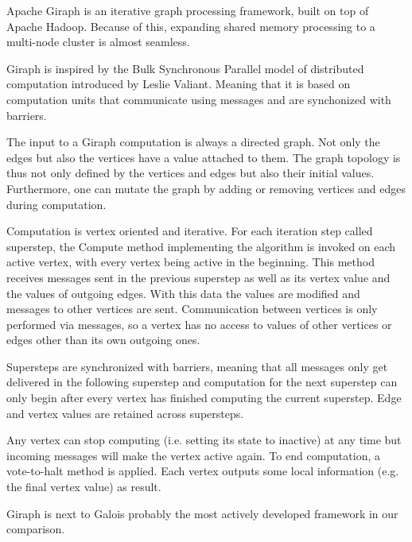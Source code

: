 

Apache Giraph\cite{Giraph} is an iterative graph processing framework, built on top of Apache Hadoop. Because of this, expanding shared memory processing to a multi-node cluster is almost seamless.

Giraph is inspired by the Bulk Synchronous Parallel model of distributed computation introduced by Leslie Valiant\cite{BSPforGiraph}. Meaning that it is based on computation units that communicate using messages and are synchonized with barriers.

The input to a Giraph computation is always a directed graph. Not only the edges but also the vertices have a value attached to them. The graph topology is thus not only defined by the vertices and edges but also their initial values.
Furthermore, one can mutate the graph by adding or removing vertices and edges during computation.

Computation is vertex oriented and iterative.
For each iteration step called superstep, the Compute method implementing the algorithm is invoked on each active vertex, with every vertex being active in the beginning.
This method receives messages sent in the previous superstep as well as its vertex value and the values of outgoing edges.
With this data the values are modified and messages to other vertices are sent.
Communication between vertices is only performed via messages, so a vertex has no access to values of other vertices or edges other than its own outgoing ones.

Supersteps are synchronized with barriers, meaning that all messages only get delivered in the following superstep and computation for the next superstep can only begin after every vertex has finished computing the current superstep.
Edge and vertex values are retained across supersteps.

Any vertex can stop computing (i.e. setting its state to inactive) at any time but incoming messages will make the vertex active again.
To end computation, a vote-to-halt method is applied. Each vertex outputs some local information (e.g. the final vertex value) as result.

Giraph is next to Galois probably the most actively developed framework in our comparison.
